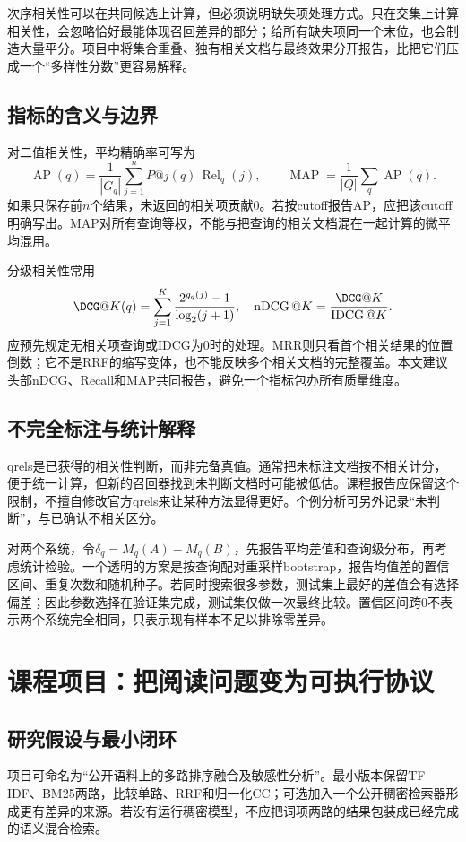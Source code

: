 \documentclass[sigconf,nonacm]{acmart}
\newcommand{\Rel}{\operatorname{Rel}}
\newcommand{\AP}{\operatorname{AP}}
\begin{document}
次序相关性可以在共同候选上计算，但必须说明缺失项处理方式。只在交集上计算相关性，会忽略恰好最能体现召回差异的部分；给所有缺失项同一个末位，也会制造大量平分。项目中将集合重叠、独有相关文档与最终效果分开报告，比把它们压成一个“多样性分数”更容易解释。

\subsection{指标的含义与边界}
对二值相关性，平均精确率可写为
\begin{equation}
 \AP(q)=\frac1{|G_q|}\sum_{j=1}^{n}P@j(q)\,\Rel_q(j),
 \qquad \operatorname{MAP}=\frac1{|Q|}\sum_q\AP(q).
\end{equation}
如果只保存前$n$个结果，未返回的相关项贡献0。若按cutoff报告AP，应把该cutoff明确写出。MAP对所有查询等权，不能与把查询的相关文档混在一起计算的微平均混用。

分级相关性常用
\begin{equation}
 \DCG@K(q)=\sum_{j=1}^{K}\frac{2^{g_q(j)}-1}{\log_2(j+1)},
 \quad \operatorname{nDCG}@K=\frac{\DCG@K}{\operatorname{IDCG}@K}.
\end{equation}
应预先规定无相关项查询或IDCG为0时的处理。MRR则只看首个相关结果的位置倒数；它不是RRF的缩写变体，也不能反映多个相关文档的完整覆盖。本文建议头部nDCG、Recall和MAP共同报告，避免一个指标包办所有质量维度。

\subsection{不完全标注与统计解释}
qrels是已获得的相关性判断，而非完备真值。通常把未标注文档按不相关计分，便于统一计算，但新的召回器找到未判断文档时可能被低估。课程报告应保留这个限制，不擅自修改官方qrels来让某种方法显得更好。个例分析可另外记录“未判断”，与已确认不相关区分。

对两个系统，令$\delta_q=M_q(A)-M_q(B)$，先报告平均差值和查询级分布，再考虑统计检验。一个透明的方案是按查询配对重采样bootstrap，报告均值差的置信区间、重复次数和随机种子。若同时搜索很多参数，测试集上最好的差值会有选择偏差；因此参数选择在验证集完成，测试集仅做一次最终比较。置信区间跨0不表示两个系统完全相同，只表示现有样本不足以排除零差异。

\section{课程项目：把阅读问题变为可执行协议}
\subsection{研究假设与最小闭环}
项目可命名为“公开语料上的多路排序融合及敏感性分析”。最小版本保留TF--IDF、BM25两路，比较单路、RRF和归一化CC；可选加入一个公开稠密检索器形成更有差异的来源。若没有运行稠密模型，不应把词项两路的结果包装成已经完成的语义混合检索。
\end{document}
